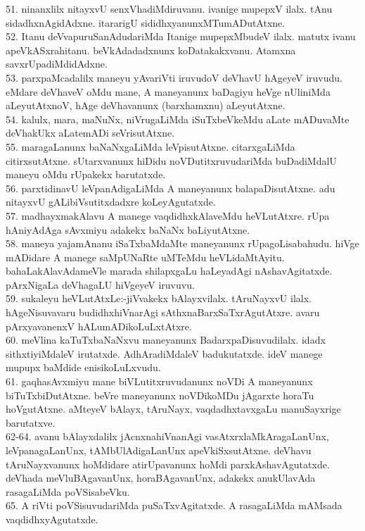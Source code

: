 \documentclass{article}
\begin{document}
51. ninanxlilx nitayxvU senxVhadiMdiruvanu. ivanige mupepxV ilalx. tAnu sidadhxnAgidAdxne. itararigU sididhxyanunxMTumADutAtxne.\\
52. Itanu deVvapuruSanAdudariMda Itanige mupepxMbudeV ilalx. matutx ivanu apeVkASxrahitanu. beVkAdadadxnunx koDatakakxvanu. Atamxna savxrUpadiMdidAdxne.\\
53. parxpaMcadalilx maneyu yAvariVti iruvudoV deVhavU hAgeyeV iruvudu. eMdare deVhaveV oMdu mane, A maneyanunx baDagiyu heVge nUliniMda aLeyutAtxnoV, hAge deVhavanunx (barxhamxnu) aLeyutAtxne.\\
54. kalulx, mara, maNuNx, niVrugaLiMda iSuTxbeVkeMdu aLate mADuvaMte deVhakUkx aLatemADi seVrisutAtxne.\\
55. maragaLanunx baNaNxgaLiMda leVpisutAtxne. citarxgaLiMda citirxsutAtxne. sUtarxvanunx hiDidu noVDutitxruvudariMda buDadiMdalU maneyu oMdu rUpakekx barutatxde.\\
56. parxtidinavU leVpanAdigaLiMda A maneyanunx balapaDisutAtxne. adu nitayxvU gALibiVsutitxdadxre koLeyAgutatxde.\\
57. madhayxmakAlavu A manege vaqdidhxkAlaveMdu heVLutAtxre. rUpa hAniyAdAga sAvxmiyu adakekx baNaNx baLiyutAtxne.\\
58. maneya yajamAnanu iSaTxbaMdaMte maneyanunx rUpagoLisabahudu. hiVge mADidare A manege saMpUNaRte uMTeMdu heVLidaMtAyitu. bahaLakAlavAdameVle marada shilapxgaLu haLeyadAgi nAshavAgitatxde. pArxNigaLa deVhagaLU hiVgeyeV iruvuvu.\\
59. sukaleyu heVLutAtxLe:-jiVvakekx bAlayxvilalx. tAruNayxvU ilalx. hAgeNisuvavaru budidhxhiVnarAgi sAthxnaBarxSaTxrAgutAtxre. avaru pArxyavanenxV hALumADikoLuLxtAtxre.\\
60. meVlina kaTuTxbaNaNxvu maneyanunx BadarxpaDisuvudilalx. idadx sithxtiyiMdaleV irutatxde. AdhAradiMdaleV badukutatxde. ideV manege mupupx baMdide enisikoLuLxvudu.\\
61. gaqhasAvxmiyu mane biVLutitxruvudanunx noVDi A maneyanunx biTuTxbiDutAtxne. beVre maneyanunx noVDikoMDu jAgarxte horaTu hoVgutAtxne. aMteyeV bAlayx, tAruNayx, vaqdadhxtavxgaLu manuSayxrige barutatxve.\\
62-64. avanu bAlayxdalilx jAcnxnahiVnanAgi vasAtxrxlaMkAragaLanUnx, leVpanagaLanUnx, tAMbUlAdigaLanUnx apeVkiSxsutAtxne. deVhavu tAruNayxvanunx hoMdidare atirUpavanunx hoMdi parxkAshavAgutatxde. deVhada meVluBAgavanUnx, horaBAgavanUnx, adakekx anukUlavAda rasagaLiMda poVSisabeVku.\\
65. A riVti poVSisuvudariMda puSaTxvAgitatxde. A rasagaLiMda mAMsada vaqdidhxyAgutatxde.\\
\end{document}
